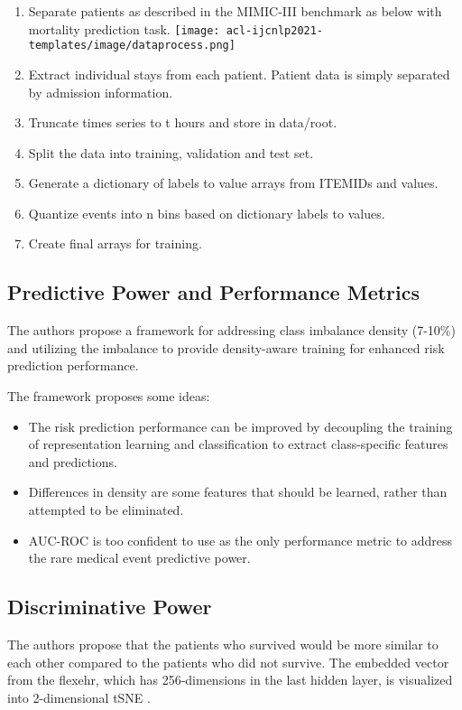 \documentclass[11pt,a4paper]{article}
\begin{document}
\begin{enumerate}
    \item Separate patients as described in the MIMIC-III benchmark \cite{mimiciiibenchmark} as below with mortality prediction task. 
    \texttt{[image: acl-ijcnlp2021-templates/image/dataprocess.png]}
    \item Extract individual stays from each patient. Patient data is simply separated by admission information.
    \item Truncate times series to t hours and store in data/root.
    \item Split the data into training, validation and test set.
    \item Generate a dictionary of labels to value arrays from ITEMIDs and values.
    \item Quantize events into n bins based on dictionary labels to values.
    \item Create final arrays for training.
\end{enumerate}



\subsection{Predictive Power and Performance Metrics}
The authors propose a framework for addressing class imbalance density (7-10\%) and utilizing the imbalance to provide density-aware training for enhanced risk prediction performance.  

The framework proposes some ideas: 
\begin{itemize}
    \item The risk prediction performance can be improved by decoupling the training of representation learning and classification to extract class-specific features and predictions.  
    \item Differences in density are some features that should be learned, rather than attempted to be eliminated. 
    \item AUC-ROC is too confident to use as the only performance metric to address the rare medical event predictive power. 
\end{itemize}

\subsection{Discriminative Power}
The authors propose that  the patients who survived would be more similar to each other compared to the patients who did not survive. The embedded vector from the flexehr, which has 256-dimensions in the last hidden layer, is visualized into 2-dimensional tSNE \cite{tsne}.
\end{document}
